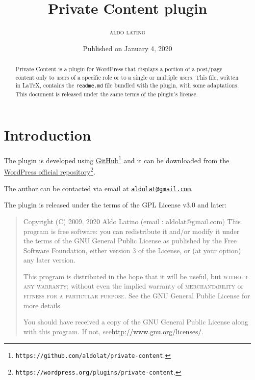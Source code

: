 \documentclass[a4paper,10pt]{article}
\begin{document}
\title{Private Content plugin}
\author{\textsc{aldo latino}}
\date{Published on January 4, 2020}

\maketitle

\begin{abstract}
\noindent Private Content is a plugin for WordPress that displays a portion of a post/page content only to users of a specific role or to a single or multiple users. This file, written in \LaTeX, contains the \texttt{readme.md} file bundled with the plugin, with some adaptations. This document is released under the same terms of the plugin's license.
\end{abstract}

\newpage

\tableofcontents

\newpage

\section{Introduction}

The plugin is developed using \href{https://github.com/aldolat/private-content}{GitHub}\footnote{\texttt{https://github.com/aldolat/private-content}.} and it can be downloaded from the \href{https://wordpress.org/plugins/private-content}{WordPress official repository}\footnote{\texttt{https://wordpress.org/plugins/private-content}.}.

The author can be contacted via email at \href{mailto:aldolat@gmail.com}{\texttt{aldolat@gmail.com}}.

The plugin is released under the terms of the GPL License v3.0 and later:

\begin{quote}
Copyright (C) 2009, 2020  Aldo Latino  (email : aldolat@gmail.com)
This program is free software: you can redistribute it and/or modify
it under the terms of the GNU General Public License as published by
the Free Software Foundation, either version 3 of the License, or
(at your option) any later version.

This program is distributed in the hope that it will be useful,
but \textsc{without any warranty}; without even the implied warranty of
\textsc{merchantability} or \textsc{fitness for a particular purpose}.  See the
GNU General Public License for more details.

You should have received a copy of the GNU General Public License
along with this program. If not, see\newline\href{http://www.gnu.org/licenses/}{http://www.gnu.org/licenses/}.
\end{quote}
\end{document}

